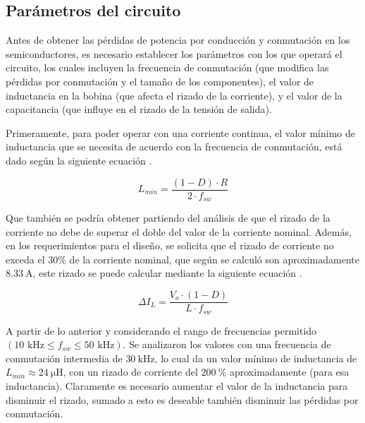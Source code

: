 \documentclass[journal]{IEEEtran}
\begin{document}
\subsection{Parámetros del circuito}
Antes de obtener las pérdidas de potencia por conducción y conmutación en los semiconductores, es necesario establecer los parámetros
con los que operará el circuito, los cuales incluyen la frecuencia de conmutación (que modifica las pérdidas por conmutación y el tamaño de los componentes), 
el valor de inductancia en la bobina (que afecta el rizado de la corriente), y el valor de la capacitancia (que influye en el rizado de la tensión de salida).

\setlength{\parskip}{1em}

Primeramente, para poder operar con una corriente continua, el valor mínimo de inductancia que se necesita de acuerdo con la frecuencia de 
conmutación, está dado según la siguiente ecuación \cite{hart2011power}.

\begin{equation}
    L_{min} = \frac{(1 - D) \cdot R}{2 \cdot f_{sw}}
\end{equation}

Que también se podría obtener partiendo del análisis de que el rizado de la corriente no debe de superar el doble
del valor de la corriente nominal. Además, en los requerimientos para el diseño, se solicita que el rizado de corriente
no exceda el $30 \%$ de la corriente nominal, que según se calculó son aproximadamente $8.33~\mathrm{A}$, este rizado 
se puede calcular mediante la siguiente ecuación \cite{hart2011power}.

\begin{equation}
    \Delta I_L = \frac{V_{o} \cdot (1 - D)}{L \cdot f_{sw}}
\end{equation}

A partir de lo anterior y considerando el rango de frecuencias permitido $(10 \text{ kHz} \leq f_{sw} \leq 50 \text{ kHz})$. Se
analizaron los valores con una frecuencia de conmutación intermedia de $30~\mathrm{kHz}$, lo cual da un valor mínimo de inductancia de $L_{min} \approx 24~\mathrm{\mu H}$,
con un rizado de corriente del $200~\%$ aproximadamente (para esa inductancia). Claramente es necesario aumentar el valor de la inductancia para disminuir el rizado, 
sumado a esto es deseable también disminuir las pérdidas por conmutación.
\end{document}
